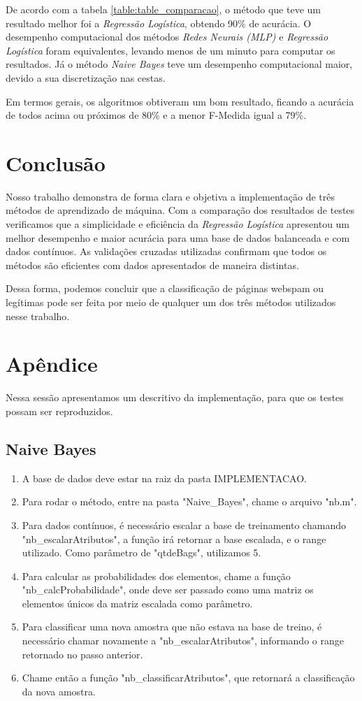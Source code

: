\documentclass[10pt, conference, compsocconf]{IEEEtran}
\begin{document}
De acordo com a tabela \ref{table:table_comparacao}, o método que teve um resultado melhor foi a \textit{Regressão Logística}, obtendo 90\% de acurácia. O desempenho computacional dos métodos \textit{Redes Neurais (MLP)}  e \textit{Regressão Logística} foram equivalentes, levando menos de um minuto para computar os resultados. Já o método \textit{Naive Bayes} teve um desempenho computacional maior, devido a sua discretização nas cestas.

Em termos gerais, os algoritmos obtiveram um bom resultado, ficando a acurácia de todos acima ou próximos de 80\% e a menor F-Medida igual a 79\%.


\section{Conclusão}\label{conclusao}
Nosso trabalho demonstra de forma clara e objetiva a implementação de três métodos de aprendizado de máquina. Com a comparação dos resultados de testes verificamos que a simplicidade e eficiência da \textit{Regressão Logística} apresentou um melhor desempenho e maior acurácia para uma base de dados balanceada e com dados contínuos. As validações cruzadas utilizadas confirmam que todos os métodos são eficientes com dados apresentados de maneira distintas.

Dessa forma, podemos concluir que a classificação de páginas webspam ou legítimas pode ser feita por meio de qualquer um dos três métodos utilizados nesse trabalho.





\newpage
\section{Apêndice}
Nessa sessão apresentamos um descritivo da implementação, para que os testes possam ser reproduzidos.

\subsection{Naive Bayes}
\begin{enumerate}
\item A base de dados deve estar na raiz da pasta IMPLEMENTACAO.
\item Para rodar o método, entre na pasta "Naive\_Bayes", chame o arquivo "nb.m".
\item Para dados contínuos, é necessário escalar a base de treinamento chamando "nb\_escalarAtributos", a função irá retornar a base escalada, e o range utilizado. Como parâmetro de "qtdeBags", utilizamos 5.
\item Para calcular as probabilidades dos elementos, chame a função "nb\_calcProbabilidade", onde deve ser passado como uma matriz os elementos únicos da matriz escalada como parâmetro.
\item Para classificar uma nova amostra que não estava na base de treino, é necessário chamar novamente a "nb\_escalarAtributos", informando o range retornado no passo anterior.
\item Chame então a função "nb\_classificarAtributos", que retornará a classificação da nova amostra.
\end{enumerate}
\end{document}
